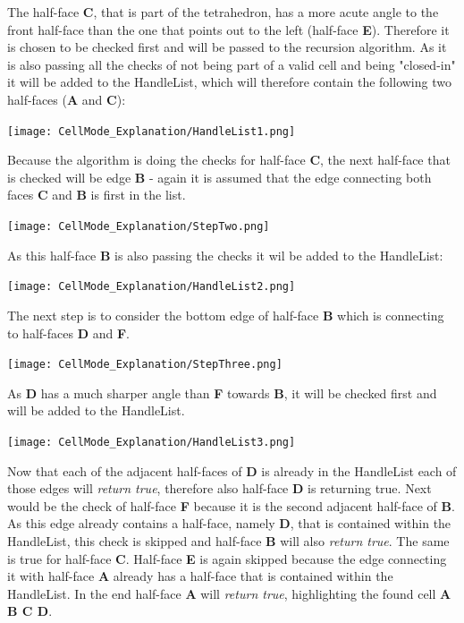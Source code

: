 \documentclass{report}
\begin{document}
	The half-face \textbf{C}, that is part of the tetrahedron, has a more acute angle to the front half-face than the one that points out to the left (half-face \textbf{E}). Therefore it is chosen to be checked first and will be passed to the recursion algorithm. As it is also passing all the checks of not being part of a valid cell and being "closed-in" it will be added to the HandleList, which will therefore contain the following two half-faces (\textbf{A} and \textbf{C}):
	\begin{center}
		\texttt{[image: CellMode\_Explanation/HandleList1.png]}
		\label{pic:picB.5}
	\end{center}
	Because the algorithm is doing the checks for half-face \textbf{C}, the next half-face that is checked will be edge \textbf{B} - again it is assumed that the edge connecting both faces \textbf{C} and \textbf{B} is first in the list.
	\begin{center}
		\texttt{[image: CellMode\_Explanation/StepTwo.png]}
		\label{pic:picB.6}
	\end{center}
	As this half-face \textbf{B} is also passing the checks it wil be added to the HandleList:
	\begin{center}
		\texttt{[image: CellMode\_Explanation/HandleList2.png]}
		\label{pic:picB.5}
	\end{center}
	The next step is to consider the bottom edge of half-face \textbf{B} which is connecting to half-faces \textbf{D} and \textbf{F}.
	\begin{center}
		\texttt{[image: CellMode\_Explanation/StepThree.png]}
		\label{pic:picB.6}
	\end{center}
	 As \textbf{D} has a much sharper angle than \textbf{F} towards \textbf{B}, it will be checked first and will be added to the HandleList.
	 \begin{center}
		\texttt{[image: CellMode\_Explanation/HandleList3.png]}
		\label{pic:picB.5}
	\end{center}
	Now that each of the adjacent half-faces of \textbf{D} is already in the HandleList each of those edges will \textit{return true}, therefore also half-face \textbf{D} is returning true. Next would be the check of half-face \textbf{F} because it is the second adjacent half-face of \textbf{B}. As this edge already contains a half-face, namely \textbf{D}, that is contained within the HandleList, this check is skipped and half-face \textbf{B} will also \textit{return true}. The same is true for half-face \textbf{C}. Half-face \textbf{E} is again skipped because the edge connecting it with half-face \textbf{A} already has a half-face that is contained within the HandleList. In the end half-face \textbf{A} will \textit{return true}, highlighting the found cell \textbf{A B C D}.
\end{document}
